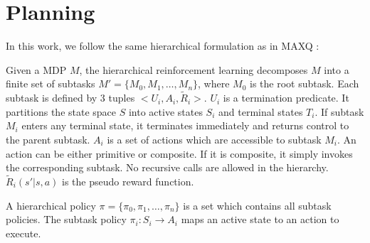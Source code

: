 


\chapter{Planning}

In this work, we follow the same hierarchical formulation as in MAXQ \cite{MaxQJ}:
\begin{definition}
    Given a MDP $M$, the hierarchical reinforcement learning decomposes $M$ into a finite
    set of subtasks $M' = \{M_0, M_1, \dots, M_n\}$, where $M_0$ is the root subtask. 
    Each subtask is defined by 3 tuples $<U_i, A_i, \tilde{R}_i>$. 
    $U_i$ is a termination predicate. It partitions the state space $S$ into active states $S_i$ and
                terminal states $T_i$. If subtask $M_i$ enters any terminal state, it terminates immediately
                and returns control to the parent subtask. 
    $A_i$ is a set of actions which are accessible to subtask $M_i$. An action can be either primitive or composite.
                If it is composite, it simply invokes the corresponding subtask. No recursive calls 
                are allowed in the hierarchy.
    $\tilde{R}_i(s'|s, a)$ is the pseudo reward function. 
\end{definition}
A hierarchical policy $\pi = \{\pi_0, \pi_1, \dots, \pi_n\}$ is a set which contains all subtask policies. 
The subtask policy $\pi_i: S_i \rightarrow A_i$ maps an active state to an action to execute.


